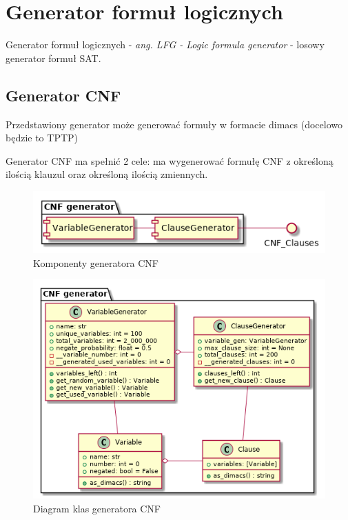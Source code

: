 \documentclass[a4paper,12pt]{article}
\begin{document}
\section{Generator formuł logicznych} \label{LFG}

Generator formuł logicznych - \textit{ang. LFG - Logic formula generator} - losowy generator formuł SAT.

\subsection{Generator CNF}

Przedstawiony generator może generować formuły w formacie dimacs (docelowo będzie to TPTP)

Generator CNF ma spełnić 2 cele: ma wygenerować formułę CNF z określoną ilością klauzul oraz określoną ilością zmiennych.

\begin{figure}[H]
  \centering
  \includegraphics[scale=0.5]{lfg/components.png}
  \caption{Komponenty generatora CNF}
\end{figure}


\begin{figure}[H]
  \centering
  \includegraphics[scale=0.7]{lfg/cnf_class_diagram.png}
  \caption{Diagram klas generatora CNF}
\end{figure}
\end{document}
